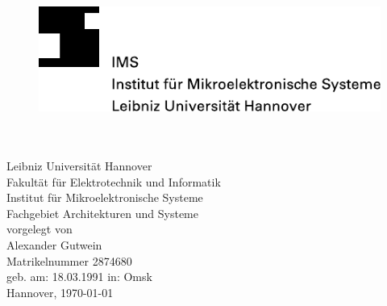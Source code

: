 \begin{titlepage}
	\begin{figure}[ht]
			\includegraphics{pics/IMS_LUH.pdf}
	\end{figure}
	
\vspace{3cm}

\begin{center}
	\Huge{}\\
	\vspace{40pt}
  \LARGE{}\\
	\vspace{60pt}
  \Large{	Leibniz Universität Hannover\\
					Fakultät für Elektrotechnik und Informatik\\
					Institut für Mikroelektronische Systeme\\
					Fachgebiet Architekturen und Systeme}\\
	\vspace{100pt}
  \large{vorgelegt von}\\
  \vspace{20pt}
	\Large{Alexander Gutwein\\
         Matrikelnummer 2874680}\\
  \Large{geb. am: 18.03.1991 \hspace{10pt}in: Omsk}\\
	\vspace{30pt}
	\large{Hannover, \today}
	  
  \end{center}

\end{titlepage}

